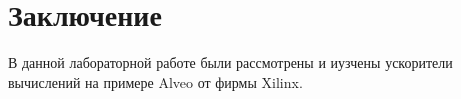 \chapter*{Заключение}

В данной лабораторной работе были рассмотрены и иузчены ускорители вычислений на примере Alveo от фирмы Xilinx.
